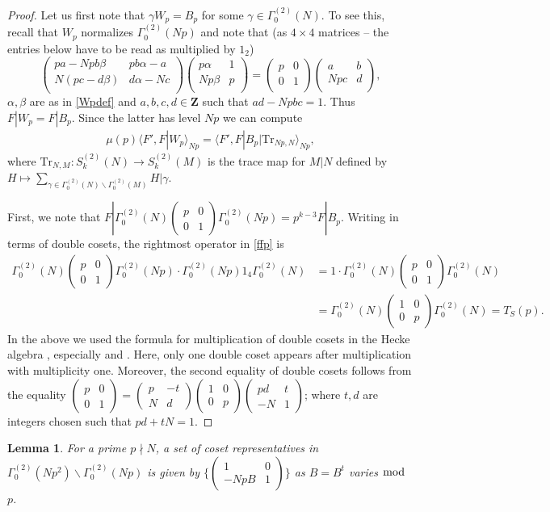 \documentclass[11pt]{amsart}
\numberwithin{equation}{section}
\theoremstyle{plain}
\newtheorem{lem}[thm]{Lemma}
\theoremstyle{definition}
\newcommand{\mf}{\mathbf}
\newcommand{\mrm}{\mathrm}
\newcommand{\lan}{\langle }
\newcommand{\ran}{\rangle}
\newcommand{\sumn}{\sum \nolimits}
\newcommand{\psmb}{\left( \begin{smallmatrix}}
\newcommand{\psme}{ \end{smallmatrix} \right) }
\newcommand{\smat}[4]{\left( \begin{smallmatrix}#1&#2\\#3&#4\end{smallmatrix}\right)}
\newcommand{\pmat}[4]{\begin{pmatrix} #1 & #2 \\ #3 & #4 \\ \end{pmatrix} }
\begin{document}
\begin{proof}
Let us first note that $\gamma W_p= B_p $ for some $\gamma\in \Gamma^{(2)}_0(N)$. To see this, recall that $W_p$ normalizes $\Gamma^{(2)}_0(Np)$ and note that (as $4 \times 4$ matrices -- the entries below have to be read as multiplied by $1_2$)
\begin{equation} \label{bp=wp}
    \pmat{pa-Npb\beta }{pb\alpha-a}{N(pc-d\beta)}{d\alpha-Nc} \pmat{p\alpha}{1}{Np\beta}{p}=\pmat{p}{0}{0}{1}\pmat{a}{b}{Npc}{d}, 
\end{equation}
$\alpha, \beta$ are as in \eqref{Wpdef} and $a,b,c,d\in \mf Z$ such that $ad-Npbc=1$. Thus $F|W_p= F|B_p$.
Since the latter has level $Np$ we can compute
\begin{align} \label{ffp}
    \mu(p)  \lan F', F|W_p \ran_{Np} =\lan F', F|B_p| \mrm{Tr}_{Np,N} \ran_{Np}, 
\end{align}
where $\mrm{Tr}_{N,M} \colon S_k^{(2)}(N) \rightarrow S_k^{(2)}(M) $ is the trace map for $M|N$ defined by $\displaystyle H \mapsto \sumn_{\gamma \in \Gamma^{(2)}_0(N) \backslash \Gamma^{(2)}_0(M) } H|\gamma$.

First, we note that $F|\Gamma^{(2)}_0(N)\smat{p}{0}{0}{1} \Gamma^{(2)}_0(Np)= p^{k-3} F|B_p$.  Writing in terms of double cosets, the rightmost operator in \eqref{ffp} is 
\begin{align}
    \Gamma^{(2)}_0(N)\smat{p}{0}{0}{1} \Gamma^{(2)}_0(Np) \cdot \Gamma^{(2)}_0(Np) 1_4 \Gamma^{(2)}_0(N)& = 1 \cdot \Gamma^{(2)}_0(N)\smat{p}{0}{0}{1} \Gamma^{(2)}_0(N)\nonumber \\
    &=   \Gamma^{(2)}_0(N) \smat{1}{0}{0}{p} \Gamma^{(2)}_0(N) =  T_S(p).
\end{align}
In the above we used the formula for multiplication of double cosets in the Hecke algebra \cite{shimura-aut}, especially \cite[(3.1.1)]{shimura-aut} and \cite[Prop.~3.3]{shimura-aut}. Here, only one double coset appears after multiplication with multiplicity one. Moreover, the second equality of double cosets follows from the equality $\psmb p & 0 \\ 0 & 1 \psme=\psmb p & -t \\ N & d \psme \psmb 1 & 0 \\ 0 & p \psme \psmb  pd & t \\ -N & 1 \psme$; where $t,d$ are integers chosen such that $pd+tN=1$.
\end{proof}

\begin{lem} \label{p2p-lem}
    For a prime $p\nmid N$, a set of coset representatives in $\Gamma^{(2)}_0(Np^2) \backslash \Gamma^{(2)}_0(Np)$ is given by $\{ \smat{1}{0}{-NpB}{1}\}$ as $B=B^t$ varies $\bmod$ $p$.
\end{lem}
\end{document}
